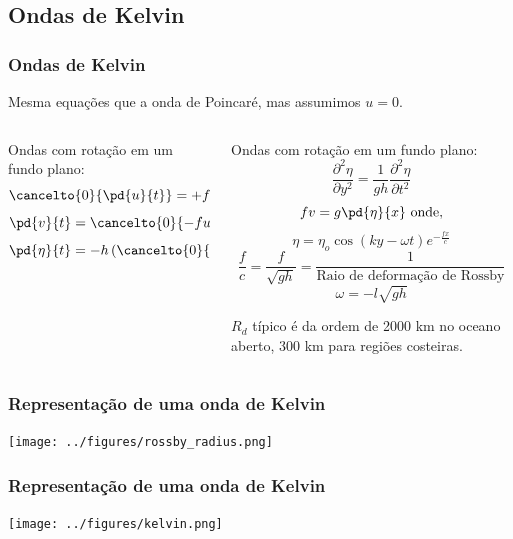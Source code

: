 \subsection{Ondas de Kelvin}
\begin{frame}
\frametitle{Ondas de Kelvin}
{\scriptsize
  Mesma equações que a onda de Poincaré, mas assumimos $u=0$.
  \begin{columns}
    \begin{column}{0.5\textwidth}
    \begin{block}{}
      Ondas com rotação em um fundo plano:
      \[
          \cancelto{0}{\pd{u}{t}} = +fv -g\pd{\eta}{x}
       \]
      \[
          \pd{v}{t} = \cancelto{0}{-fu} -g\pd{\eta}{y}
       \]
      \[
          \pd{\eta}{t} = -h\left(\cancelto{0}{\pd{u}{x}} + \pd{v}{y}\right)
       \]
    \end{block}
    \end{column}
    \begin{column}{0.5\textwidth}
    \begin{block}{}
      Ondas com rotação em um fundo plano:
      \[
          \frac{\partial^2\eta}{\partial y^2} = \frac{1}{gh}\frac{\partial^2\eta}{\partial{t^2}}
       \]
      \[
          fv = g\pd{\eta}{x} \text{ onde,}
       \]
      \[
          \eta = \eta_o\cos(ky - \omega t)e^{-\frac{fx}{c}}
       \]
      \[
          \frac{f}{c} = \frac{f}{\sqrt{gh}} = \frac{1}{\text{Raio de deformação de Rossby}}
       \]
      \[
          \omega = -l\sqrt{gh}
      \]

    \end{block}
    $R_d$ típico é da ordem de 2000 km no oceano aberto, 300 km para regiões
    costeiras.
    \end{column}
  \end{columns}
}
\end{frame}

\begin{frame}
  \frametitle{Representação de uma onda de Kelvin}
  \begin{center}
    \texttt{[image: ../figures/rossby\_radius.png]}
  \end{center}
\end{frame}


\begin{frame}
  \frametitle{Representação de uma onda de Kelvin}
  \begin{center}
    \texttt{[image: ../figures/kelvin.png]}
  \end{center}
\end{frame}

